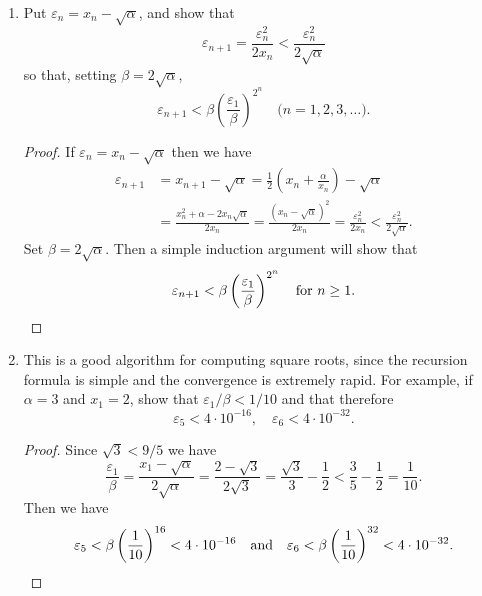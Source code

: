 \begin{enumerate}
\begin{proof}
    Now, since $\{x_n\}$ is a monotonic sequence that is bounded below
    by $\sqrt\alpha$, it must converge to some value $x$. Then we have
    \begin{equation*}
      x = \lim_{n\to\infty}x_n
      = \lim_{n\to\infty}\frac12\left(x_n + \frac\alpha{x_n}\right)
      = \frac12\left(x + \frac\alpha{x}\right).
    \end{equation*}
    So $2x = x + \alpha/x$ hence $x = \sqrt\alpha$.
  \end{proof}
\item Put $\varepsilon_n = x_n - \sqrt\alpha$, and show that
  \begin{equation*}
    \varepsilon_{n+1} = \frac{\varepsilon_n^2}{2x_n}
    < \frac{\varepsilon_n^2}{2\sqrt\alpha}
  \end{equation*}
  so that, setting $\beta = 2\sqrt\alpha$,
  \begin{equation*}
    \varepsilon_{n+1}<\beta\left(\frac{\varepsilon_1}\beta\right)^{2^n}
    \quad\text{($n = 1,2,3,\dots$)}.
  \end{equation*}
  \begin{proof}
    If $\varepsilon_n = x_n - \sqrt\alpha$ then we have
    \begin{align*}
      \varepsilon_{n+1}
      &= x_{n+1} - \sqrt\alpha
      = \frac12\left(x_n + \frac\alpha{x_n}\right) - \sqrt\alpha \\
      &= \frac{x_n^2 + \alpha - 2x_n\sqrt\alpha}{2x_n}
      = \frac{(x_n - \sqrt\alpha)^2}{2x_n}
      = \frac{\varepsilon_n^2}{2x_n} < \frac{\varepsilon_n^2}{2\sqrt\alpha}.
    \end{align*}
    Set $\beta = 2\sqrt\alpha$. Then a simple induction argument will
    show that
    \begin{equation*}
      \varepsilon_{n+1} < \beta\left(\frac{\varepsilon_1}\beta\right)^{2^n}
      \quad\text{for $n\geq1$}. \qedhere
    \end{equation*}
  \end{proof}
\item This is a good algorithm for computing square roots, since the
  recursion formula is simple and the convergence is extremely
  rapid. For example, if $\alpha = 3$ and $x_1 = 2$, show that
  $\varepsilon_1/\beta < 1/10$ and that therefore
  \begin{equation*}
    \varepsilon_5 < 4\cdot10^{-16},
    \quad\varepsilon_6 < 4\cdot10^{-32}.
  \end{equation*}
  \begin{proof}
    Since $\sqrt3 < 9/5$ we have
    \begin{equation*}
      \frac{\varepsilon_1}\beta = \frac{x_1-\sqrt\alpha}{2\sqrt\alpha}
      = \frac{2-\sqrt3}{2\sqrt3} = \frac{\sqrt3}3 - \frac12
      < \frac35 - \frac12 = \frac1{10}.
    \end{equation*}
    Then we have
    \begin{equation*}
      \varepsilon_5 < \beta\left(\frac1{10}\right)^{16} < 4\cdot10^{-16}
      \quad\text{and}\quad
      \varepsilon_6 < \beta\left(\frac1{10}\right)^{32} < 4\cdot10^{-32}.
      \qedhere
    \end{equation*}
  \end{proof}
\end{enumerate}
